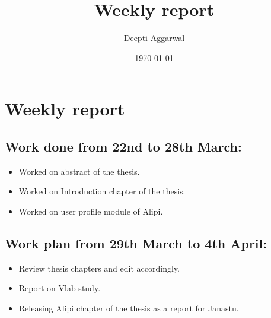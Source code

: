 \documentclass[11pt]{article}
\title{Weekly report}
\author{Deepti Aggarwal}
\date{\today}
\begin{document}
\maketitle

\setcounter{tocdepth}{3}
\vspace*{1cm}
\section{Weekly report}
\label{sec-1}

\subsection{Work done from 22nd to 28th March:}
\label{sec-1-1}
\begin{itemize}
\item Worked on abstract of the thesis. 
\item Worked on Introduction chapter of the thesis. 
\item Worked on user profile module of Alipi.
\end{itemize}

\subsection{Work plan from 29th March to 4th April:}
\label{sec-1-1}
\begin{itemize}
\item Review thesis chapters and edit accordingly.
\item Report on Vlab study.
\item Releasing Alipi chapter of the thesis as a report for Janastu.
\end{itemize}
\end{document}
